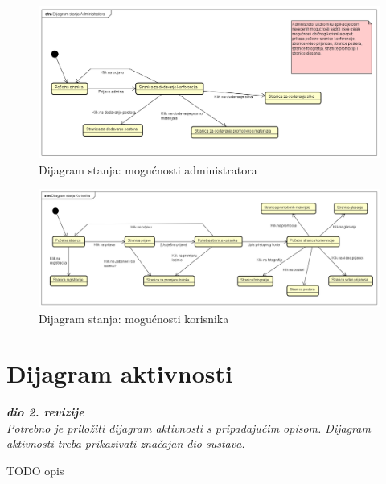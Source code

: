 			\begin{figure}[H]
				\includegraphics[width=\textwidth]{slike/adminStanja.PNG} %
				\caption{Dijagram stanja: mogućnosti administratora}
				\label{fig:adminStanje} %
			\end{figure}
			\begin{figure}[H]
				\includegraphics[width=\textwidth]{slike/korisnikStanja.PNG} %
				\caption{Dijagram stanja: mogućnosti korisnika}
				\label{fig:korisnikStanje} %
			\end{figure}


			\eject

		\section{Dijagram aktivnosti}

			\textbf{\textit{dio 2. revizije}}\\

			 \textit{Potrebno je priložiti dijagram aktivnosti s pripadajućim opisom. Dijagram aktivnosti treba prikazivati značajan dio sustava.}
			
			TODO opis
			
